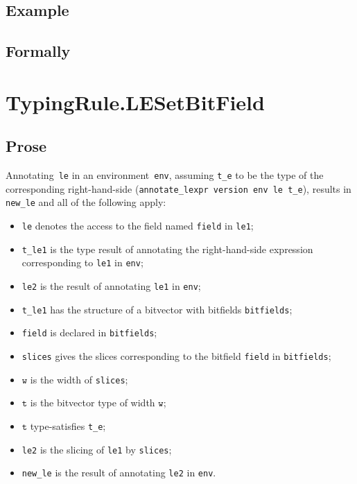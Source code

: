 \documentclass{book}
\newcommand\vt[0]{\texttt{t}}
\newcommand\vw[0]{\texttt{w}}
\begin{document}
\begin{itemize}
  \subsection{Example}



\begin{emptyformal}
    \subsection{Formally}
\end{emptyformal}


\section{TypingRule.LESetBitField \label{sec:TypingRule.LESetBitField}}

    \subsection{Prose}
   Annotating~\texttt{le} in an environment~\texttt{env}, assuming
\texttt{t\_e} to be the type of the corresponding right-hand-side
(\texttt{annotate\_lexpr version env le t\_e}), results in \texttt{new\_le} and
all of the following apply:
   \begin{itemize}
   \item \texttt{le} denotes the access to the field named \texttt{field} in \texttt{le1};
   \item \texttt{t\_le1} is the type result of annotating the right-hand-side expression corresponding to \texttt{le1} in \texttt{env};
   \item \texttt{le2} is the result of annotating \texttt{le1} in \texttt{env};
   \item \texttt{t\_le1} has the structure of a bitvector with bitfields \texttt{bitfields};
   \item \texttt{field} is declared in \texttt{bitfields};
   \item \texttt{slices} gives the slices corresponding to the bitfield \texttt{field} in
      \texttt{bitfields};
   \item $\vw$ is the width of \texttt{slices};
   \item $\vt$ is the bitvector type of width $\vw$;
   \item $\vt$ type-satisfies \texttt{t\_e};
   \item \texttt{le2} is the slicing of \texttt{le1} by \texttt{slices};
   \item \texttt{new\_le} is the result of annotating \texttt{le2} in \texttt{env}.
   \end{itemize}


\end{itemize}
\end{document}
